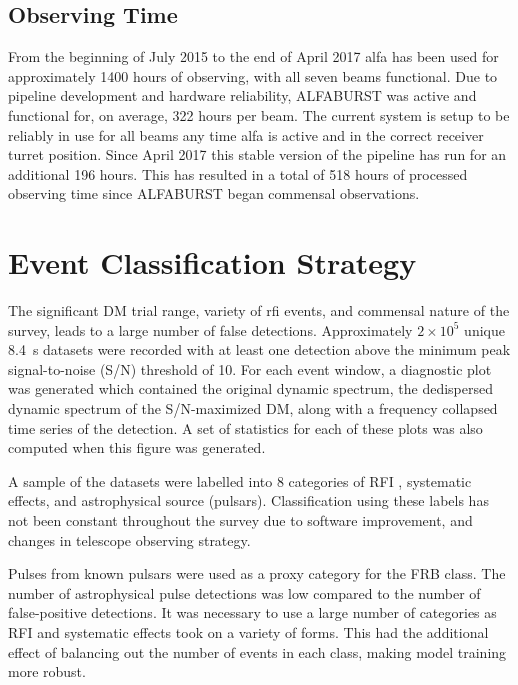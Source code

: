 \documentclass[a4paper,fleqn,usenatbib]{mnras}
\begin{document}


\subsection{Observing Time}
\label{sec:obs_time}

From the beginning of July 2015 to the end of April 2017 \gls{alfa} has been
used for approximately 1400 hours of observing, with all seven beams functional.
Due to pipeline development and hardware reliability, ALFABURST was active and
functional for, on average, 322 hours per beam.  The current system is setup to
be reliably in use for all beams any time \gls{alfa} is active and in the
correct receiver turret position. Since April 2017 this stable version of the
pipeline has run for an additional 196 hours. This has resulted in a total of
518 hours of processed observing time since ALFABURST began commensal
observations.



\section{Event Classification Strategy}
\label{sec:event_classify}


The significant DM trial range, variety of \gls{rfi} events, and commensal
nature of the survey, leads to a large number of false detections. Approximately
$2 \times 10^5$ unique 8.4~s datasets were recorded with at least one detection
above the minimum peak signal-to-noise (S/N) threshold of 10. For each event
window, a diagnostic plot was generated which contained the original dynamic
spectrum, the dedispersed dynamic spectrum of the S/N-maximized DM, along with a
frequency collapsed time series of the detection. A set of statistics for each
of these plots was also computed when this figure was generated.

A sample of the datasets were labelled into 8 categories of RFI
, systematic effects, and astrophysical source
(pulsars). Classification using these labels has not been constant throughout
the survey due to software improvement, and changes in telescope observing
strategy.

Pulses from known pulsars were used as a proxy category for the FRB class. The
number of astrophysical pulse detections was low compared to the number of
false-positive detections. It was necessary to use a large number of categories
as RFI and systematic effects took on a variety of forms.  This had the
additional effect of balancing out the number of events in each class, making
model training more robust.
\end{document}
